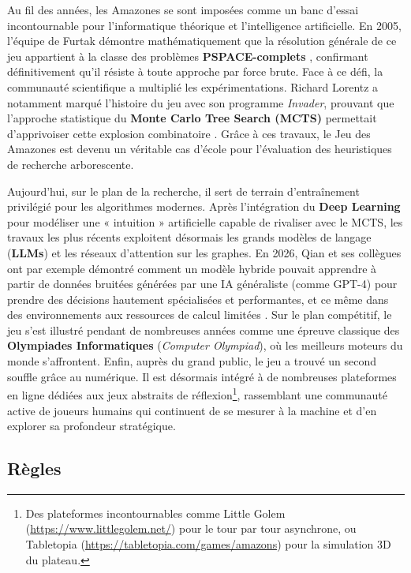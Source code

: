 \documentclass[a4paper]{article}
\begin{document}
Au fil des années, les Amazones se sont imposées comme un banc d'essai incontournable pour l'informatique théorique et l'intelligence artificielle. En 2005, l'équipe de Furtak démontre mathématiquement que la résolution générale de ce jeu appartient à la classe des problèmes \textbf{PSPACE-complets} \cite{furtak2005}, confirmant définitivement qu'il résiste à toute approche par force brute. Face à ce défi, la communauté scientifique a multiplié les expérimentations. Richard Lorentz a notamment marqué l'histoire du jeu avec son programme \textit{Invader}, prouvant que l'approche statistique du \textbf{Monte Carlo Tree Search (MCTS)} permettait d'apprivoiser cette explosion combinatoire \cite{lorentz2008}. Grâce à ces travaux, le Jeu des Amazones est devenu un véritable cas d'école pour l'évaluation des heuristiques de recherche arborescente.

Aujourd'hui, sur le plan de la recherche, il sert de terrain d'entraînement privilégié pour les algorithmes modernes. Après l'intégration du \textbf{Deep Learning} pour modéliser une « intuition » artificielle capable de rivaliser avec le MCTS, les travaux les plus récents exploitent désormais les grands modèles de langage (\textbf{LLMs}) et les réseaux d'attention sur les graphes. En 2026, Qian et ses collègues ont par exemple démontré comment un modèle hybride pouvait apprendre à partir de données bruitées générées par une IA généraliste (comme GPT-4) pour prendre des décisions hautement spécialisées et performantes, et ce même dans des environnements aux ressources de calcul limitées \cite{qian2026resource}. Sur le plan compétitif, le jeu s'est illustré pendant de nombreuses années comme une épreuve classique des \textbf{Olympiades Informatiques} (\textit{Computer Olympiad}), où les meilleurs moteurs du monde s'affrontent. Enfin, auprès du grand public, le jeu a trouvé un second souffle grâce au numérique. Il est désormais intégré à de nombreuses plateformes en ligne dédiées aux jeux abstraits de réflexion\footnote{Des plateformes incontournables comme Little Golem (\url{https://www.littlegolem.net/}) pour le tour par tour asynchrone, ou Tabletopia (\url{https://tabletopia.com/games/amazons}) pour la simulation 3D du plateau.}, rassemblant une communauté active de joueurs humains qui continuent de se mesurer à la machine et d'en explorer sa profondeur stratégique.

\subsection{Règles}
\end{document}
